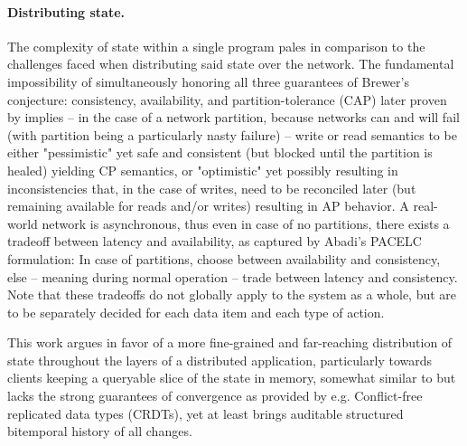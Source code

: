 \paragraph{Distributing state.} The complexity of state within a single program pales in comparison to the challenges faced when distributing said state over the network. The fundamental impossibility of simultaneously honoring all three guarantees of Brewer's conjecture: consistency, availability, and partition-tolerance (CAP) \cite{brewer2000towards} later proven by \cite{gilbert2002brewer} implies -- in the case of a network partition, because networks can and will fail (with partition being a particularly nasty failure) -- write or read semantics to be either "pessimistic" yet safe and consistent (but blocked until the partition is healed) yielding CP semantics, or "optimistic" yet possibly resulting in inconsistencies that, in the case of writes, need to be reconciled later (but remaining available for reads and/or writes) resulting in AP behavior. A real-world network is asynchronous, thus even in case of no partitions, there exists a tradeoff between latency and availability, as captured by Abadi's PACELC \cite{abadi2012consistency} formulation: In case of partitions, choose between availability and consistency, else -- meaning during normal operation -- trade between latency and consistency. Note that these tradeoffs do not globally apply to the system as a whole, but are to be separately decided for each data item and each type of action.

This work argues in favor of a more fine-grained and far-reaching distribution of state throughout the layers of a distributed application, particularly towards clients keeping a queryable slice of the state in memory, somewhat similar to \cite{jungnickel2018feasibility} but lacks the strong guarantees of convergence as provided by e.g. Conflict-free replicated data types (CRDTs), yet at least brings auditable structured bitemporal history of all changes.
